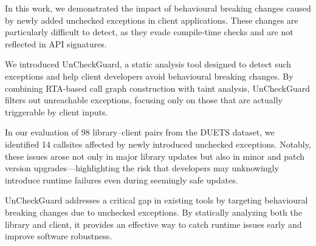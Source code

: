In this work, we demonstrated the impact of behavioural breaking changes caused by newly added unchecked exceptions in client applications. These changes are particularly difficult to detect, as they evade compile-time checks and are not reflected in API signatures.

We introduced UnCheckGuard, a static analysis tool designed to detect such exceptions and help client developers avoid behavioural breaking changes. By combining RTA-based call graph construction with taint analysis, UnCheckGuard filters out unreachable exceptions, focusing only on those that are actually triggerable by client inputs.

In our evaluation of 98 library–client pairs from the DUETS dataset, we identified 14 callsites affected by newly introduced unchecked exceptions. Notably, these issues arose not only in major library updates but also in minor and patch version upgrades—highlighting the risk that developers may unknowingly introduce runtime failures even during seemingly safe updates.

UnCheckGuard addresses a critical gap in existing tools by targeting behavioural breaking changes due to unchecked exceptions. By statically analyzing both the library and client, it provides an effective way to catch runtime issues early and improve software robustness.